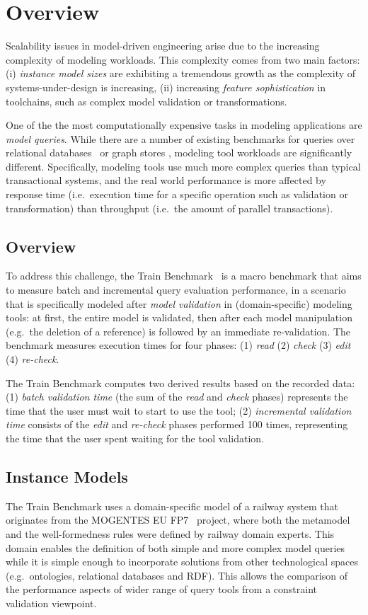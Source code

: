 \chapter{Overview}

Scalability issues in model-driven engineering arise due to the increasing
complexity of modeling workloads. This complexity comes from two main factors:
(i) \emph{instance model sizes} are exhibiting a tremendous growth as the
complexity of systems-under-design is increasing, (ii) increasing \emph{feature
sophistication} in toolchains, such as complex model validation or
transformations.

One of the the most computationally expensive tasks in modeling applications are
\emph{model queries}. While there are a number of existing benchmarks for
queries over relational databases~\cite{tpc-c} or graph stores
\cite{BSBM, SP2Bench}, modeling tool workloads are significantly
different. Specifically, modeling tools use much more complex queries than
typical transactional systems, and the real world performance is more affected by
response time (i.e.\ execution time for a specific operation such as validation
or transformation) than throughput (i.e.\ the amount of parallel transactions).


\section{Overview}
To address this challenge, the Train Benchmark~\cite{SCP2014,TBwebsite} is a macro
benchmark that aims to measure batch and incremental query evaluation
performance, in a scenario that is specifically modeled after \emph{model
validation} in (domain-specific) modeling tools: at first, the entire model is
validated, then after each model manipulation (e.g.\ the deletion of a
reference) is followed by an immediate re-validation. The benchmark measures
execution times for four phases: (1) \emph{read} (2) \emph{check} (3) \emph{edit} (4) \emph{re-check}.

The Train Benchmark computes two derived results based on the recorded data:
(1) \emph{batch validation time} (the sum of the \emph{read} and \emph{check} phases)
represents the time that the user must wait to start to use the tool; (2)
\emph{incremental validation time} consists of the \emph{edit} and
\emph{re-check} phases performed 100 times, representing the time that the
user spent waiting for the tool validation.


\section{Instance Models}
The Train Benchmark uses a domain-specific model of a railway system that
originates from the \mbox{MOGENTES} EU FP7~\cite{Mogentes} project, where both the metamodel and the
well-formedness rules were defined by railway domain experts. This domain
enables the definition of both simple and more complex model queries while it is
simple enough to incorporate solutions from other technological spaces
(e.g.\ ontologies, relational databases and RDF). This allows the comparison of
the performance aspects of wider range of query tools from a constraint
validation viewpoint.

